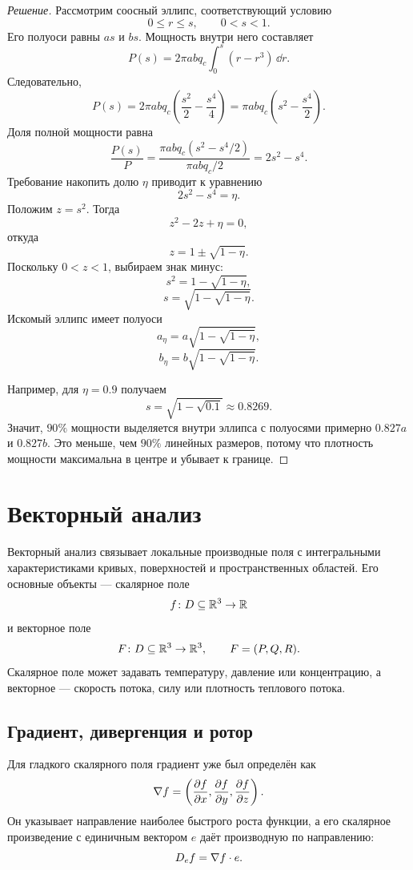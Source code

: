 \begin{proof}[Решение]
Рассмотрим соосный эллипс, соответствующий условию
\[
0\leq r\leq s,
\qquad 0<s<1.
\]
Его полуоси равны $as$ и $bs$. Мощность внутри него составляет
\[
P(s)
=
2\pi abq_c
\int_0^s(r-r^3)\,\dd r.
\]
Следовательно,
\[
P(s)
=
2\pi abq_c
\left(
\frac{s^2}{2}-\frac{s^4}{4}
\right)
=
\pi abq_c
\left(
s^2-\frac{s^4}{2}
\right).
\]
Доля полной мощности равна
\[
\frac{P(s)}{P}
=
\frac{
\pi abq_c(s^2-s^4/2)
}{
\pi abq_c/2
}
=
2s^2-s^4.
\]
Требование накопить долю $\eta$ приводит к уравнению
\[
2s^2-s^4=\eta.
\]
Положим $z=s^2$. Тогда
\[
z^2-2z+\eta=0,
\]
откуда
\[
z=1\pm\sqrt{1-\eta}.
\]
Поскольку $0<z<1$, выбираем знак минус:
\[
s^2=1-\sqrt{1-\eta},
\]
\begin{equation}
\label{eq:power-fraction-radius}
s
=
\sqrt{1-\sqrt{1-\eta}}.
\end{equation}
Искомый эллипс имеет полуоси
\[
a_{\eta}
=
a\sqrt{1-\sqrt{1-\eta}},
\]
\[
b_{\eta}
=
b\sqrt{1-\sqrt{1-\eta}}.
\]

Например, для $\eta=0.9$ получаем
\[
s
=
\sqrt{1-\sqrt{0.1}}
\approx0.8269.
\]
Значит, $90\%$ мощности выделяется внутри эллипса с полуосями примерно $0.827a$ и $0.827b$. Это меньше, чем $90\%$ линейных размеров, потому что плотность мощности максимальна в центре и убывает к границе.
\end{proof}


\section{Векторный анализ}
\label{sec:vector-analysis}

Векторный анализ связывает локальные производные поля с интегральными характеристиками кривых, поверхностей и пространственных областей. Его основные объекты --- скалярное поле
\[
f\colon D\subseteq\mathbb{R}^3\to\mathbb{R}
\]
и векторное поле
\[
F\colon D\subseteq\mathbb{R}^3\to\mathbb{R}^3,
\qquad
F=(P,Q,R).
\]
Скалярное поле может задавать температуру, давление или концентрацию, а векторное --- скорость потока, силу или плотность теплового потока.

\subsection{Градиент, дивергенция и ротор}

Для гладкого скалярного поля градиент уже был определён как
\[
\nabla f
=
\left(
\frac{\partial f}{\partial x},
\frac{\partial f}{\partial y},
\frac{\partial f}{\partial z}
\right).
\]
Он указывает направление наиболее быстрого роста функции, а его скалярное произведение с единичным вектором $e$ даёт производную по направлению:
\[
D_e f=\nabla f\cdot e.
\]

